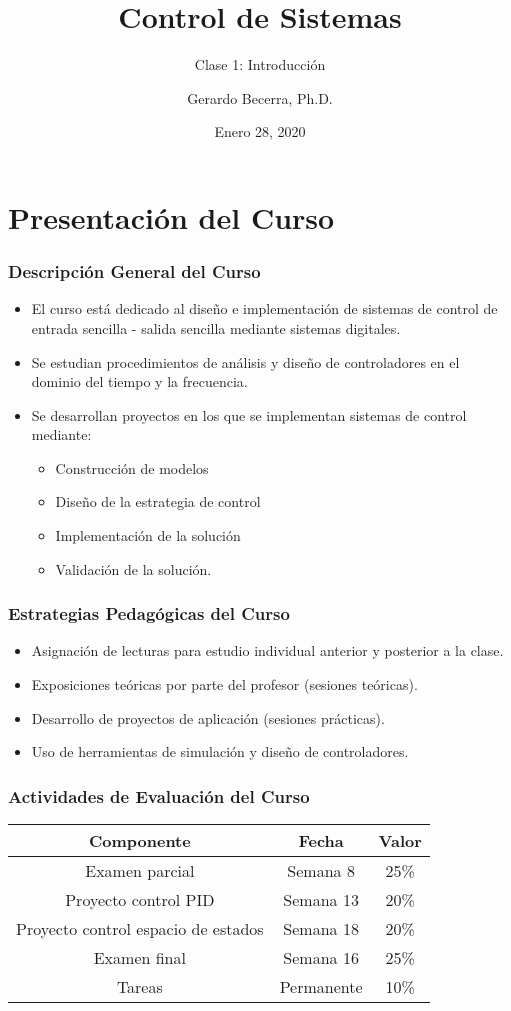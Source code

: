 \documentclass[aspectratio=169,handout]{beamer}
\title{Control de Sistemas}
\subtitle{Clase 1: Introducción}
\author{Gerardo Becerra, Ph.D.}
\institute{Pontificia Universidad Javeriana\\ Departamento de Electrónica}
\date{Enero 28, 2020}
\theoremstyle{definition}
\theoremstyle{plain}
\theoremstyle{remark}
\begin{document}
\frame{\titlepage}	


\section{Presentación del Curso}
\begin{frame}[<+->]\frametitle{Descripción General del Curso}
\begin{itemize}
  \item El curso está dedicado al diseño e implementación de sistemas de control de entrada sencilla - salida sencilla mediante sistemas digitales.
  \item Se estudian procedimientos de análisis y diseño de controladores en el dominio del tiempo y la frecuencia.
  \item Se desarrollan proyectos en los que se implementan sistemas de control mediante:
  \begin{itemize}
    \item Construcción de modelos
    \item Diseño de la estrategia de control
    \item Implementación de la solución
    \item Validación de la solución.
  \end{itemize}
\end{itemize}
\end{frame}

\begin{frame}[<+->]\frametitle{Estrategias Pedagógicas del Curso}
\begin{itemize}
  \item Asignación de lecturas para estudio individual anterior y posterior a la clase.
  \item Exposiciones teóricas por parte del profesor (sesiones teóricas).
  \item Desarrollo de proyectos de aplicación (sesiones prácticas).
  \item Uso de herramientas de simulación y diseño de controladores.
\end{itemize}
\end{frame}

\begin{frame}[c]\frametitle{Actividades de Evaluación del Curso}
\centering
\begin{tabular}{c|c|c}
  \textbf{Componente}     & \textbf{Fecha}    & \textbf{Valor}\\
  \hline
  Examen parcial & Semana 8 & 25\% \\
  Proyecto control PID & Semana 13 & 20\% \\
  Proyecto control espacio de estados & Semana 18 & 20\% \\
  Examen final & Semana 16 & 25\% \\
  Tareas & Permanente & 10\%
\end{tabular}
\end{frame}
\end{document}
